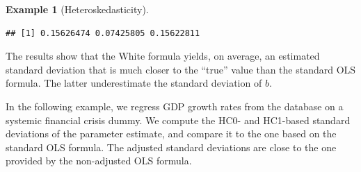 \documentclass[
  12pt,
]{book}
\newenvironment{Shaded}{\begin{snugshade}}{\end{snugshade}}
\newcommand{\AttributeTok}[1]{\textcolor[rgb]{0.77,0.63,0.00}{#1}}
\newcommand{\ConstantTok}[1]{\textcolor[rgb]{0.00,0.00,0.00}{#1}}
\newcommand{\DecValTok}[1]{\textcolor[rgb]{0.00,0.00,0.81}{#1}}
\newcommand{\FunctionTok}[1]{\textcolor[rgb]{0.00,0.00,0.00}{#1}}
\newcommand{\NormalTok}[1]{#1}
\newcommand{\OtherTok}[1]{\textcolor[rgb]{0.56,0.35,0.01}{#1}}
\newcommand{\SpecialCharTok}[1]{\textcolor[rgb]{0.00,0.00,0.00}{#1}}
\newcommand{\StringTok}[1]{\textcolor[rgb]{0.31,0.60,0.02}{#1}}
\theoremstyle{definition}
\theoremstyle{definition}
\newtheorem{example}{Example}[chapter]
\theoremstyle{definition}
\theoremstyle{definition}
\theoremstyle{remark}
\begin{document}
\begin{example}[Heteroskedasticity]
\begin{verbatim}
## [1] 0.15626474 0.07425805 0.15622811
\end{verbatim}

The results show that the White formula yields, on average, an estimated standard deviation that is much closer to the ``true'' value than the standard OLS formula. The latter underestimate the standard deviation of \(b\).
\end{example}

In the following example, we regress GDP growth rates from the \citet{JST_2017} database on a systemic financial crisis dummy. We compute the HC0- and HC1-based standard deviations of the parameter estimate, and compare it to the one based on the standard OLS formula. The adjusted standard deviations are close to the one provided by the non-adjusted OLS formula.

\begin{Shaded}
\end{Shaded}
\end{document}
